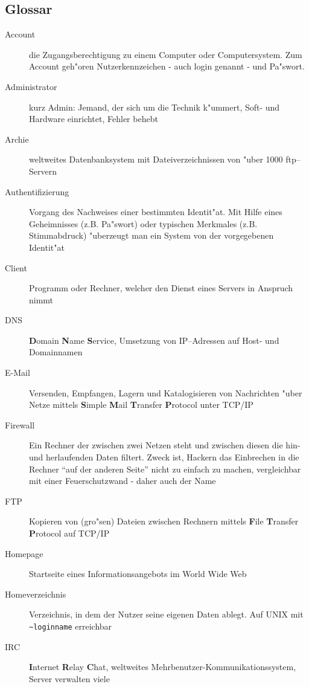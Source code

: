 \documentclass[12pt,titlepage,twoside]{scrartcl}
\begin{document}
\begin{appendix}
\clearpage

\section{Glossar}

\begin{description}
  \item[Account] die Zugangsberechtigung zu einem Computer oder
    Computersystem. Zum Account geh"oren Nutzerkennzeichen - auch login genannt
    - und Pa"swort.
  \item[Administrator] kurz Admin: Jemand, der sich um die Technik k"ummert,
    Soft- und Hardware einrichtet, Fehler behebt
  \item[Archie] weltweites Datenbanksystem mit Dateiverzeichnissen von "uber
    1000 ftp--Servern
  \item[Authentifizierung] Vorgang des Nachweises einer bestimmten
    Identit"at. Mit Hilfe eines Geheimnisses (z.B. Pa"swort) oder typischen
    Merkmales (z.B. Stimmabdruck) "uberzeugt man ein System von der
    vorgegebenen Identit"at
  \item[Client] Programm oder Rechner, welcher den Dienst eines Servers in
    Anspruch nimmt
  \item[DNS] \textbf{D}omain \textbf{N}ame \textbf{S}ervice, Umsetzung von
    IP--Adressen auf Host- und Domainnamen
  \item[E-Mail] Versenden, Empfangen, Lagern und Katalogisieren von
    Nachrichten "uber Netze mittels \textbf{S}imple \textbf{M}ail
    \textbf{T}ransfer \textbf{P}rotocol unter TCP/IP 
  \item[Firewall] Ein Rechner der zwischen zwei Netzen steht und zwischen
    diesen die hin- und herlaufenden Daten filtert. Zweck ist, Hackern das
    Einbrechen in die Rechner "`auf der anderen Seite"' nicht zu einfach zu
    machen, vergleichbar mit einer Feuerschutzwand - daher auch der Name
  \item[FTP] Kopieren von (gro"sen) Dateien zwischen Rechnern mittels 
      \textbf{F}ile \textbf{T}ransfer \textbf{P}rotocol auf TCP/IP
  \item[Homepage] Startseite eines Informationsangebots im World Wide Web
  \item[Homeverzeichnis] Verzeichnis, in dem der Nutzer seine eigenen Daten
    ablegt. Auf UNIX mit \verb#~loginname# erreichbar
  \item[IRC] \textbf{I}nternet \textbf{R}elay \textbf{C}hat, weltweites
    Mehrbenutzer-Kommunikationssystem, Server verwalten viele

\end{description}
\end{appendix}
\end{document}
